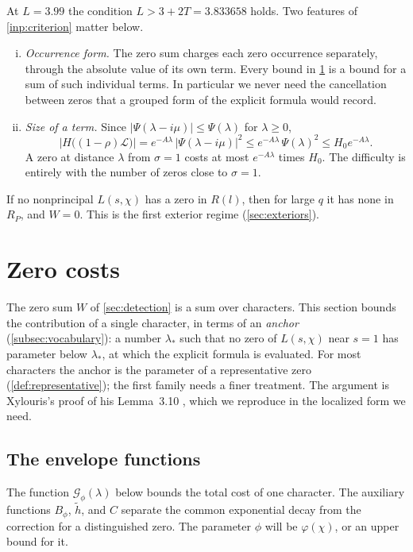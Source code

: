 \documentclass[11pt]{amsart}
\numberwithin{equation}{section}
\theoremstyle{plain}
\theoremstyle{definition}
\theoremstyle{remark}
\newcommand{\LL}{\mathcal{L}}
\newcommand{\1}{\mathbf{1}}
\begin{document}
At $L=3.99$ the condition $L>3+2T=3.833658$ holds. Two features of \cref{inp:criterion} matter
below.
\begin{enumerate}[(i)]
  \item \emph{Occurrence form.} The zero sum charges each zero occurrence separately, through the
    absolute value of its own term. Every bound in \cref{sec:costs} is a bound for a sum of such
    individual terms. In particular we never need the cancellation between zeros that a grouped
    form of the explicit formula would record.
  \item \emph{Size of a term.} Since $|\Psi(\lambda-i\mu)|\le\Psi(\lambda)$ for $\lambda\ge0$,
    \begin{equation}\label{eq:termbound}
      \bigl|H\bigl((1-\rho)\LL\bigr)\bigr|=e^{-A\lambda}\,|\Psi(\lambda-i\mu)|^2\le
      e^{-A\lambda}\,\Psi(\lambda)^2\le H_0e^{-A\lambda}.
    \end{equation}
    A zero at distance $\lambda$ from $\sigma=1$ costs at most $e^{-A\lambda}$ times $H_0$. The
    difficulty is entirely with the number of zeros close to $\sigma=1$.
\end{enumerate}

If no nonprincipal $L(s,\chi)$ has a zero in $R(l)$, then for large $q$ it has none in $R_P$, and
$W=0$. This is the first exterior regime (\cref{sec:exteriors}).

\section{Zero costs}\label{sec:costs}

The zero sum $W$ of \cref{sec:detection} is a sum over characters. This section bounds the
contribution of a single character, in terms of an \emph{anchor} (\cref{subsec:vocabulary}): a
number $\lambda_*$ such that no zero of $L(s,\chi)$ near $s=1$ has parameter below $\lambda_*$, at which
the explicit formula is evaluated. For most characters the anchor is
the parameter of a representative zero (\cref{def:representative}); the first family needs a
finer treatment. The argument is Xylouris's proof of his Lemma~3.10 \cite[pp.~35--36]{Xylouris2011nullstellen},
which we reproduce in the localized form we need.

\subsection{The envelope functions}\label{subsec:envelope}
The function $\mathcal G_\phi(\lambda)$ below bounds the total cost of one character.
The auxiliary functions $B_\phi$, $\tilde h$, and $C$ separate the common exponential
decay from the correction for a distinguished zero. The parameter $\phi$ will be
$\varphi(\chi)$, or an upper bound for it.
\end{document}
